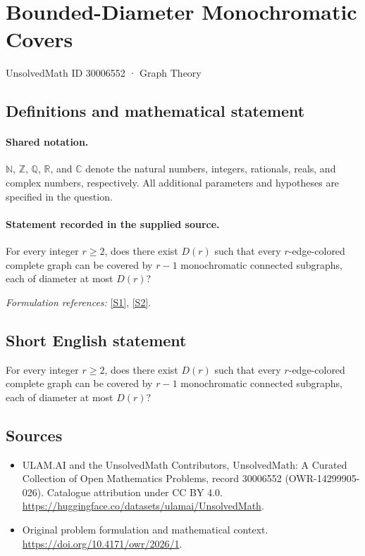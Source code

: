 \documentclass[11pt]{article}
\newcommand{\sref}[2]{\hyperlink{source:#1:#2}{[S#2]}}
\begin{document}
\setcounter{section}{30006551}
\section{Bounded-Diameter Monochromatic Covers}\label{30006552}
{\small UnsolvedMath ID 30006552 · Graph Theory}
\subsection{Definitions and mathematical statement}

\paragraph{Shared notation.}$\mathbb N$, $\mathbb Z$, $\mathbb Q$, $\mathbb R$, and $\mathbb C$ denote the natural numbers, integers, rationals, reals, and complex numbers, respectively. All additional parameters and hypotheses are specified in the question.


\paragraph{Statement recorded in the supplied source.}
For every integer $r\geq2$, does there exist $D(r)$ such that every $r$-edge-colored complete graph can be covered by $r-1$ monochromatic connected subgraphs, each of diameter at most $D(r)$?
\par\smallskip\textit{Formulation references:} \sref{30006552}{1}, \sref{30006552}{2}.
\subsection{Short English statement}
For every integer $r\geq2$, does there exist $D(r)$ such that every $r$-edge-colored complete graph can be covered by $r-1$ monochromatic connected subgraphs, each of diameter at most $D(r)$?
\subsection{Sources}
\begin{itemize}
\item[\hypertarget{source:30006552:1}{S1}] ULAM.AI and the UnsolvedMath Contributors, UnsolvedMath: A Curated Collection of Open Mathematics Problems, record 30006552 (OWR-14299905-026). Catalogue attribution under CC BY 4.0.
\url{https://huggingface.co/datasets/ulamai/UnsolvedMath}.
\item[\hypertarget{source:30006552:2}{S2}] Original problem formulation and mathematical context.
\url{https://doi.org/10.4171/owr/2026/1}.
\end{itemize}
\label{end:30006552}
\end{document}
